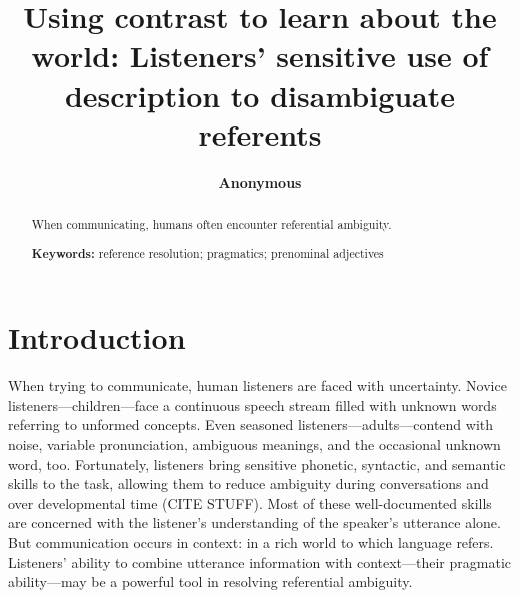 \documentclass[10pt, letterpaper]{article}
\title{Using contrast to learn about the world: Listeners' sensitive use of
description to disambiguate referents}
\author{{\large \bf Anonymous}}
\begin{document}
\maketitle

\begin{abstract}
When communicating, humans often encounter referential ambiguity.

\textbf{Keywords:}
reference resolution; pragmatics; prenominal adjectives
\end{abstract}

\section{Introduction}\label{introduction}

When trying to communicate, human listeners are faced with uncertainty.
Novice listeners---children---face a continuous speech stream filled
with unknown words referring to unformed concepts. Even seasoned
listeners---adults---contend with noise, variable pronunciation,
ambiguous meanings, and the occasional unknown word, too. Fortunately,
listeners bring sensitive phonetic, syntactic, and semantic skills to
the task, allowing them to reduce ambiguity during conversations and
over developmental time (CITE STUFF). Most of these well-documented
skills are concerned with the listener's understanding of the speaker's
utterance alone. But communication occurs in context: in a rich world to
which language refers. Listeners' ability to combine utterance
information with context---their pragmatic ability---may be a powerful
tool in resolving referential ambiguity.
\end{document}
